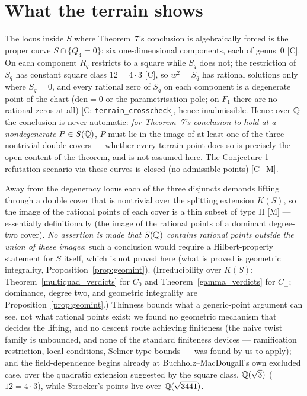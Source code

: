 \section{What the terrain shows}

The locus inside $S$ where Theorem~7's conclusion is algebraically forced is the proper
curve $S\cap\{Q_{4}=0\}$: six one-dimensional components, each of genus~$0$ [C].  On each
component $R_{q}$ restricts to a square while $S_{q}$ does not; the restriction of $S_{q}$
has constant square class $12=4\cdot 3$ [C], so $w^{2}=S_{q}$ has rational solutions only
where $S_{q}=0$, and every rational zero of $S_{q}$ on each component is a degenerate point of the
chart ($\mathrm{den}=0$ or the parametrisation pole; on $F_{1}$ there are no
rational zeros at all) [C: \texttt{terrain\_crosscheck}], hence inadmissible.  Hence over $\mathbb{Q}$ the conclusion is never automatic: \emph{for Theorem~7's
conclusion to hold at a nondegenerate $P\in S(\mathbb{Q})$}, $P$ must lie in the image
of at least one of the three nontrivial double covers --- whether every terrain
point does so is precisely the open content of the theorem, and is not assumed
here.  The Conjecture-1-refutation scenario via these curves is closed (no
admissible points) [C+M].

Away from the degeneracy locus each of the three disjuncts demands lifting through a
double cover that is nontrivial over the splitting extension $K(S)$, so the
image of the rational points of each cover is a thin subset of type II [M] ---
essentially definitionally (the image of the rational points of a dominant
degree-two cover).  \emph{No assertion is made that $S(\mathbb{Q})$ contains rational
points outside the union of these images}: such a conclusion would require a
Hilbert-property statement for $S$ itself, which is not proved here (what is
proved is geometric integrality, Proposition~\ref{prop:geomint}).
(Irreducibility over $K(S)$: Theorem~\ref{multiquad_verdicts} for $C_{0}$ and
Theorem~\ref{gamma_verdicts} for $C_{\pm}$; dominance, degree two, and geometric
integrality are Proposition~\ref{prop:geomint}.)
Thinness bounds what a generic-point argument can see, not what
rational points exist; we found no geometric mechanism that decides the lifting, and no
descent route achieving finiteness (the naive twist family is unbounded, and none of the
standard finiteness devices --- ramification restriction, local conditions, Selmer-type
bounds --- was found by us to apply); and the field-dependence begins
already at Buchholz--MacDougall's own excluded case, over the quadratic extension suggested by
the square class, $\mathbb{Q}(\sqrt{3})$ ($12=4\cdot 3$), while Stroeker's points live over $\mathbb{Q}(\sqrt{3441})$.

